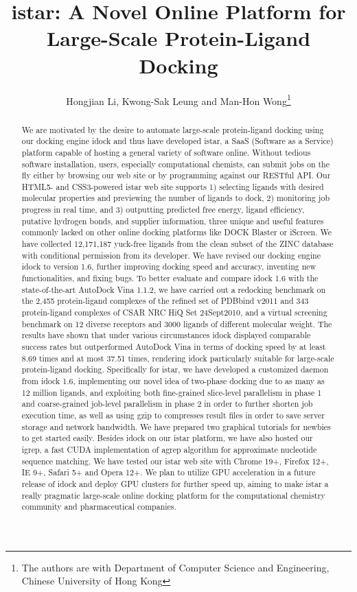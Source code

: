 \documentclass[12pt]{article}
\title{istar: A Novel Online Platform for Large-Scale Protein-Ligand Docking}
\author{Hongjian Li, Kwong-Sak Leung and Man-Hon Wong\thanks{The authors are with Department of Computer Science and Engineering, Chinese University of Hong Kong}}
\begin{document}
\maketitle

\begin{abstract}
We are motivated by the desire to automate large-scale protein-ligand docking using our docking engine idock and thus have developed istar, a SaaS (Software as a Service) platform capable of hosting a general variety of software online. Without tedious software installation, users, especially computational chemists, can submit jobs on the fly either by browsing our web site or by programming against our RESTful API. Our HTML5- and CSS3-powered istar web site supports 1) selecting ligands with desired molecular properties and previewing the number of ligands to dock, 2) monitoring job progress in real time, and 3) outputting predicted free energy, ligand efficiency, putative hydrogen bonds, and supplier information, three unique and useful features commonly lacked on other online docking platforms like DOCK Blaster or iScreen. We have collected 12,171,187 yuck-free ligands from the clean subset of the ZINC database with conditional permission from its developer. We have revised our docking engine idock to version 1.6, further improving docking speed and accuracy, inventing new functionalities, and fixing bugs. To better evaluate and compare idock 1.6 with the state-of-the-art AutoDock Vina 1.1.2, we have carried out a redocking benchmark on the 2,455 protein-ligand complexes of the refined set of PDBbind v2011 and 343 protein-ligand complexes of CSAR NRC HiQ Set 24Sept2010, and a virtual screening benchmark on 12 diverse receptors and 3000 ligands of different molecular weight. The results have shown that under various circumstances idock displayed comparable success rates but outperformed AutoDock Vina in terms of docking speed by at least 8.69 times and at most 37.51 times, rendering idock particularly suitable for large-scale protein-ligand docking. Specifically for istar, we have developed a customized daemon from idock 1.6, implementing our novel idea of two-phase docking due to as many as 12 million ligands, and exploiting both fine-grained slice-level parallelism in phase 1 and coarse-grained job-level parallelism in phase 2 in order to further shorten job execution time, as well as using gzip to compresses result files in order to save server storage and network bandwidth. We have prepared two graphical tutorials for newbies to get started easily. Besides idock on our istar platform, we have also hosted our igrep, a fast CUDA implementation of agrep algorithm for approximate nucleotide sequence matching. We have tested our istar web site with Chrome 19+, Firefox 12+, IE 9+, Safari 5+ and Opera 12+. We plan to utilize GPU acceleration in a future release of idock and deploy GPU clusters for further speed up, aiming to make istar a really pragmatic large-scale online docking platform for the computational chemistry community and pharmaceutical companies.
\end{abstract}
\end{document}
